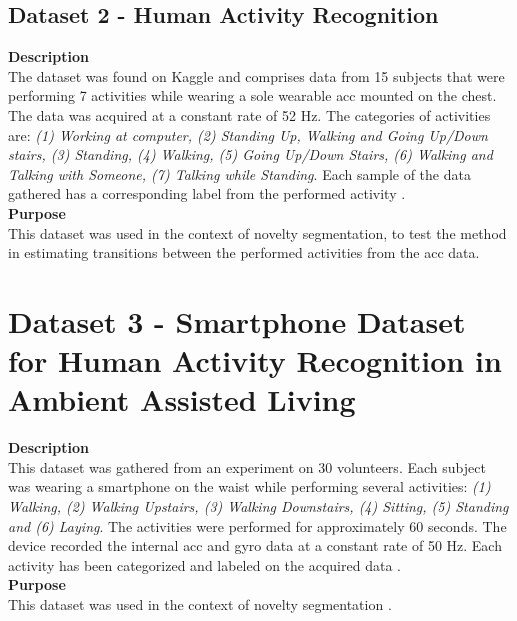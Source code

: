 \subsection{Dataset 2 - Human Activity Recognition}

\textbf{Description}\\
The dataset was found on Kaggle and comprises data from 15 subjects that were performing 7 activities while wearing a sole wearable \gls{acc} mounted on the chest. The data was acquired at a constant rate of 52 Hz. The categories of activities are: \textit{(1) Working at computer, (2) Standing Up, Walking and Going Up/Down stairs, (3) Standing, (4) Walking, (5) Going Up/Down Stairs, (6) Walking and Talking with Someone, (7) Talking while Standing}. Each sample of the data gathered has a corresponding label from the performed activity \cite{dataset1}.\\
\textbf{Purpose}\\
This dataset was used in the context of novelty segmentation, to test the method in estimating transitions between the performed activities from the \gls{acc} data. 
 


\section{Dataset 3 - Smartphone Dataset for Human Activity Recognition in Ambient Assisted Living}
\textbf{Description}\\
This dataset was gathered from an experiment on 30 volunteers. Each subject was wearing a smartphone on the waist while performing several activities: \textit{(1) Walking, (2) Walking Upstairs, (3) Walking Downstairs, (4) Sitting, (5) Standing and (6) Laying}. The activities were performed for approximately 60 seconds. The device recorded the internal \gls{acc} and \gls{gyro} data at a constant rate of 50 Hz. Each activity has been categorized and labeled on the acquired data \cite{dataset2, dataset2_2}.\\
\textbf{Purpose}\\
This dataset was used in the context of novelty segmentation \cite{dataset2, dataset2_2}.

